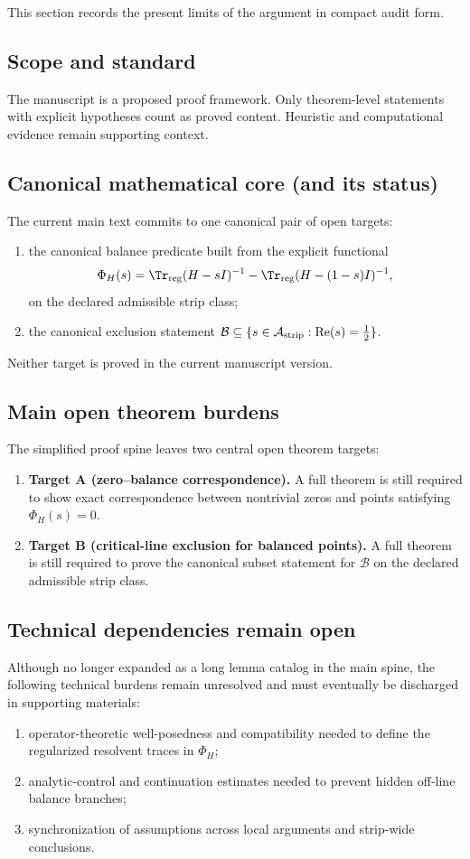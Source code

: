 This section records the present limits of the argument in compact audit form.

\subsection*{Scope and standard}
The manuscript is a proposed proof framework.
Only theorem-level statements with explicit hypotheses count as proved content.
Heuristic and computational evidence remain supporting context.

\subsection*{Canonical mathematical core (and its status)}
The current main text commits to one canonical pair of open targets:
\begin{enumerate}
  \item the canonical balance predicate built from the explicit functional
  \[
  \Phi_H(s)=\Tr_{\mathrm{reg}}(H-sI)^{-1}-\Tr_{\mathrm{reg}}(H-(1-s)I)^{-1},
  \]
  on the declared admissible strip class;
  \item the canonical exclusion statement
  \(
  \mathcal{B}\subseteq\{s\in\mathcal{A}_{\mathrm{strip}}:\operatorname{Re}(s)=\tfrac12\}
  \).
\end{enumerate}
Neither target is proved in the current manuscript version.

\subsection*{Main open theorem burdens}
The simplified proof spine leaves two central open theorem targets:
\begin{enumerate}
  \item \textbf{Target A (zero--balance correspondence).}
  A full theorem is still required to show exact correspondence between nontrivial zeros and points satisfying $\Phi_H(s)=0$.

  \item \textbf{Target B (critical-line exclusion for balanced points).}
  A full theorem is still required to prove the canonical subset statement for $\mathcal{B}$ on the declared admissible strip class.
\end{enumerate}

\subsection*{Technical dependencies remain open}
Although no longer expanded as a long lemma catalog in the main spine, the following technical burdens remain unresolved and must eventually be discharged in supporting materials:
\begin{enumerate}
  \item operator-theoretic well-posedness and compatibility needed to define the regularized resolvent traces in $\Phi_H$;
  \item analytic-control and continuation estimates needed to prevent hidden off-line balance branches;
  \item synchronization of assumptions across local arguments and strip-wide conclusions.
\end{enumerate}

